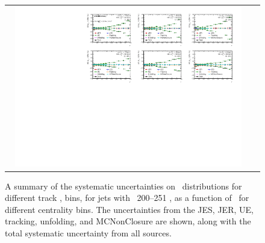 \begin{figure}
{\begin{tabular}{cc}
	 \includegraphics[page=19, width=0.95\textwidth]{figures_systematics/ChPS_dR_sys_PbPb_error} \\
\end{tabular} }
   \caption{A summary of the systematic uncertainties on \RDptr\ distributions for different track \pt, bins, for jets with \pt\ 200--251  \GeV, as a function of \rvar\ for different centrality bins. The uncertainties from the JES, JER, UE, tracking, unfolding, and MCNonClosure are shown, along with the total systematic uncertainty from all sources. }
      \label{fig:rdptr_sys_uncert_A2}
\end{figure}

